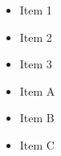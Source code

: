 \documentclass{article}
\begin{document}
\begin{minipage}[t]{0.45\linewidth}
\begin{itemize}
    \item Item 1
    \item Item 2
    \item Item 3
\end{itemize}
\end{minipage}
\hfill
\begin{minipage}[t]{0.45\linewidth}
\begin{itemize}
    \item Item A
    \item Item B
    \item Item C
\end{itemize}
\end{minipage}
\end{document}
